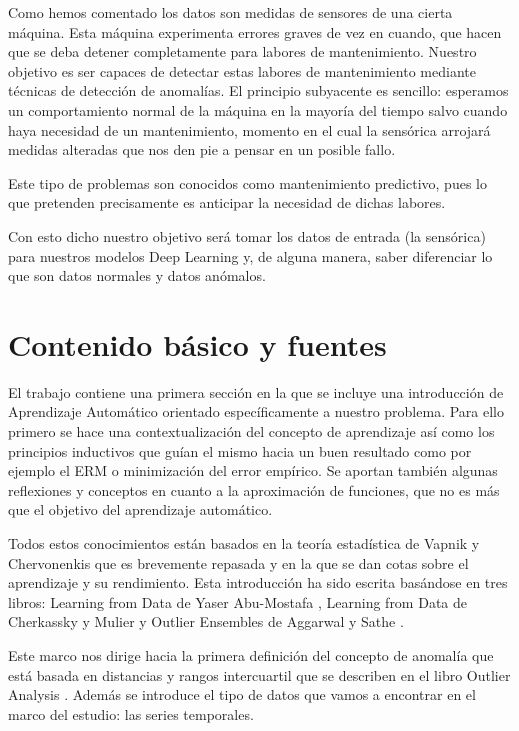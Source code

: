 Como hemos comentado los datos son medidas de sensores de una cierta máquina. Esta máquina experimenta errores graves de vez en cuando, que hacen que se deba detener completamente para labores de mantenimiento. Nuestro objetivo es ser capaces de detectar estas labores de mantenimiento mediante técnicas de detección de anomalías. El principio subyacente es sencillo: esperamos un comportamiento normal de la máquina en la mayoría del tiempo salvo cuando haya necesidad de un mantenimiento, momento en el cual la sensórica arrojará medidas alteradas que nos den pie a pensar en un posible fallo.

Este tipo de problemas son conocidos como mantenimiento predictivo, pues lo que pretenden precisamente es anticipar la necesidad de dichas labores.

Con esto dicho nuestro objetivo será tomar los datos de entrada (la sensórica) para nuestros modelos Deep Learning y, de alguna manera, saber diferenciar lo que son datos normales y datos anómalos.

\section{Contenido básico y fuentes}


El trabajo contiene una primera sección en la que se incluye una introducción de Aprendizaje Automático orientado específicamente a nuestro problema. Para ello primero se hace una contextualización del concepto de aprendizaje así como los principios inductivos que guían el mismo hacia un buen resultado como por ejemplo el ERM o minimización del error empírico. Se aportan también algunas reflexiones y conceptos en cuanto a la aproximación de funciones, que no es más que el objetivo del aprendizaje automático. 

Todos estos conocimientos están basados en la teoría estadística de Vapnik y Chervonenkis que es brevemente repasada y en la que se dan cotas sobre el aprendizaje y su rendimiento. Esta introducción ha sido escrita basándose en tres libros: Learning from Data de Yaser Abu-Mostafa \cite{yaser_learning_2012}, Learning from Data de Cherkassky y Mulier \cite{cherkassky_learning_2007}  y Outlier Ensembles de Aggarwal y Sathe \cite{aggarwal_outlier_2017-1}.

Este marco nos dirige hacia la primera definición del concepto de anomalía que está basada en distancias y rangos intercuartil que se describen en el libro Outlier Analysis \cite{aggarwal_outlier_2017}. Además se introduce el tipo de datos que vamos a encontrar en el marco del estudio: las series temporales.

